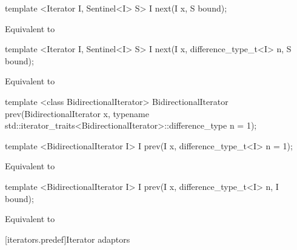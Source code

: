\begin{addedblock}
\begin{itemdecl}
template <Iterator I, Sentinel<I> S>
  I next(I x, S bound);
\end{itemdecl}

\begin{itemdescr}
\pnum
\effects Equivalent to 
\end{itemdescr}

\begin{itemdecl}
template <Iterator I, Sentinel<I> S>
  I next(I x, difference_type_t<I> n, S bound);
\end{itemdecl}

\begin{itemdescr}
\pnum
\effects Equivalent to 
\end{itemdescr}
\end{addedblock}

%
\begin{removedblock}
\begin{itemdecl}
template <class BidirectionalIterator>
  BidirectionalIterator prev(BidirectionalIterator x,
    typename std::iterator_traits<BidirectionalIterator>::difference_type n = 1);
\end{itemdecl}
\end{removedblock}
\begin{addedblock}
\begin{itemdecl}
template <BidirectionalIterator I>
  I prev(I x, difference_type_t<I> n = 1);
\end{itemdecl}
\end{addedblock}

\begin{itemdescr}
\pnum
\effects Equivalent to 
\end{itemdescr}

\begin{addedblock}
\begin{itemdecl}
template <BidirectionalIterator I>
  I prev(I x, difference_type_t<I> n, I bound);
\end{itemdecl}

\begin{itemdescr}
\pnum
\effects Equivalent to 
\end{itemdescr}
\end{addedblock}

[iterators.predef]{Iterator adaptors}

